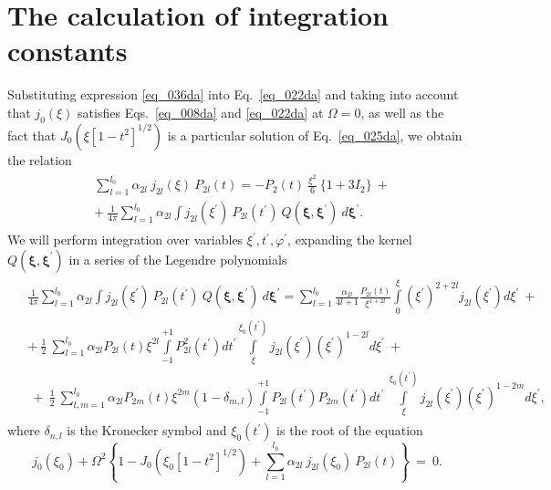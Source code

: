 \documentclass{caosp308}
\begin{document}

\section{The calculation of  integration constants}
\label{sect_04da}

Substituting expression \eqref{eq_036da} into Eq.~\eqref{eq_022da} and taking into account that $j_0(\xi)$ satisfies Eqs.~\eqref{eq_008da} and \eqref{eq_022da} at $\Omega=0$, as well as the fact that $J_0 (\xi[1-t^2]^{1/2})$ is a particular solution of  Eq.~\eqref{eq_025da}, we obtain the relation
\begin{eqnarray}
\label{eq_039da}
\begin{split}
& \sum^{l_0}_{l=1} \alpha_{2l}\:j_{2l}(\xi)\:P_{2l} (t) = -P_2 (t)\:\frac{\xi^2}{6}\:
\biggl\{1+3I_2\biggr\}\:+
\\
& +\:\frac{1}{4\pi} \sum^{l_0}_{l=1} \alpha_{2l} \int j_{2l}(\xi^{'})\:P_{2l}(t^{'})\:
Q ({\boldsymbol\xi},{\boldsymbol\xi}^{'})\:d{\boldsymbol\xi}^{'}.
\end{split}
\end{eqnarray}
We will perform integration over variables $\xi^{'},t^{'},\varphi^{'}$, expanding the kernel $Q ({\boldsymbol\xi},{\boldsymbol\xi}^{'})$ in a series of the Legendre polynomials
\begin{eqnarray}
\label{eq_040da}
\begin{split}
& \frac{1}{4\pi} \sum^{l_0}_{l=1} \alpha_{2l}\int j_{2l} (\xi^{'})\:P_{2l} (t^{'})\:Q ({\boldsymbol\xi},{\boldsymbol\xi}^{'}) \:d{\boldsymbol\xi}^{'}=\sum^{l_0}_{l=1}\frac{\alpha_{2l}}{4l+1}\frac{P_{2l}(t)}{\xi^{1+2l}} \int\limits^{\xi}_{0}
(\xi^{'})^{2+2l} j_{2l} (\xi^{'})d\xi^{'}\:+\\
& +\:\frac12\:\sum^{l_0}_{l=1} \alpha_{2l}P_{2l}(t)\xi^{2l} \int\limits^{+1}_{-1} P_{2l}^2 (t^{'}) dt^{'} \int\limits^{\xi_0 (t^{'})}_{\xi} j_{2l} (\xi^{'})(\xi^{'})^{1-2l}
d\xi^{'}\:+\\
& \:+\:\frac12\:\sum^{l_0}_{l,m=1} \alpha_{2l}P_{2m}(t)\xi^{2m} (1-\delta_{m,l})\int\limits^{+1}_{-1} P_{2l} (t^{'})P_{2m} (t^{'}) dt^{'}\:\int\limits^{\xi_0 (t^{'})}_{\xi} j_{2l} (\xi^{'})(\xi^{'})^{1-2m}
d\xi^{'},
\end{split}
\end{eqnarray}
where $\delta_{n,l}$ is the Kronecker symbol and  $\xi_0 (t^{'})$ is the root of the equation
\begin{equation}
\label{eq_041da}
j_0 (\xi_0) +\Omega^2\left\{1-J_0 (\xi_0 [1-t^2]^{1/2})+\sum^{l_0}_{l=1} \alpha_{2l}\:j_{2l}
(\xi_0)\:P_{2l}(t)\right\}\:=\:0.
\end{equation}
\end{document}
